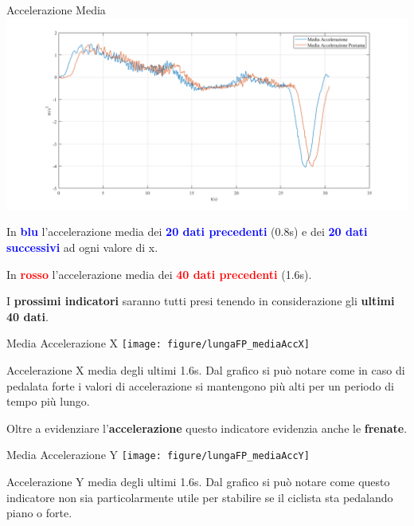 \documentclass[a4paper, 9pt]{beamer}
\begin{document}
	\begin{frame}{{Accelerazione Media}}
		\centering\includegraphics[height=.55\textheight]{figure/mediaVSmediaPost}
		
		\vspace{.05\textheight}
		In \textcolor{blue}{\textbf{blu}} l'accelerazione media dei \textcolor{blue}{\textbf{20 dati precedenti}} (0.8s) e dei \textcolor{blue}{\textbf{20 dati successivi}} ad ogni valore di x.
		
		In \textcolor{red}{\textbf{rosso}} l'accelerazione media dei \textcolor{red}{\textbf{40 dati precedenti}} (1.6s).
		
		I \textbf{prossimi indicatori} saranno tutti presi tenendo in considerazione gli \textbf{ultimi 40 dati}.
		
	\end{frame}
	
	\begin{frame}{{Media Accelerazione X}}
		\centering\texttt{[image: figure/lungaFP\_mediaAccX]}
		\vspace{.05\textheight}
	
		Accelerazione X media degli ultimi 1.6s. Dal grafico si può notare come in caso di pedalata forte i valori di accelerazione si mantengono più alti per un periodo di tempo più lungo.
		
		Oltre a evidenziare l'\textbf{accelerazione} questo indicatore evidenzia anche le \textbf{frenate}.
	\end{frame}
	
	\begin{frame}{{Media Accelerazione Y}}
		\centering\texttt{[image: figure/lungaFP\_mediaAccY]}
		\vspace{.05\textheight}
		
		Accelerazione Y media degli ultimi 1.6s. Dal grafico si può notare come questo indicatore non sia particolarmente utile per stabilire se il ciclista sta pedalando piano o forte.
	\end{frame}
	
\end{document}
